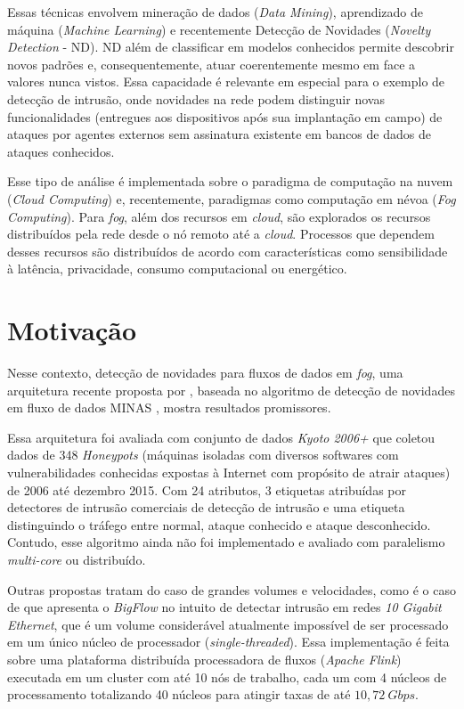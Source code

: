 Essas técnicas envolvem mineração de dados (\emph{Data Mining}), aprendizado de
máquina (\emph{Machine Learning}) e recentemente Detecção de Novidades
(\emph{Novelty Detection} - ND). ND além de classificar em modelos conhecidos
permite descobrir novos padrões e, consequentemente, atuar coerentemente mesmo
em face a valores nunca vistos. Essa capacidade é relevante em especial para o
exemplo de detecção de intrusão, onde novidades na rede podem distinguir novas
funcionalidades (entregues aos dispositivos após sua implantação em campo) de
ataques por agentes externos sem assinatura existente em bancos de
dados de ataques conhecidos.


Esse tipo de análise é implementada sobre o paradigma de computação na nuvem
(\emph{Cloud Computing}) e, recentemente, paradigmas como computação em névoa
(\emph{Fog Computing}). Para \emph{fog}, além dos recursos em \emph{cloud}, são
explorados os recursos distribuídos pela rede desde o nó remoto até a
\emph{cloud}. Processos que dependem desses recursos são distribuídos de acordo
com características como sensibilidade à latência, privacidade,
consumo computacional ou energético.

\section{Motivação}

Nesse contexto, detecção de novidades para fluxos de dados em \emph{fog}, uma
arquitetura recente proposta por , baseada no algoritmo
de detecção de novidades em fluxo de dados MINAS
\cite{Faria2016minas}, mostra resultados promissores.

Essa arquitetura foi avaliada com conjunto de dados \emph{Kyoto 2006+} que
coletou dados de 348 \emph{Honeypots} (máquinas isoladas com diversos softwares
com vulnerabilidades conhecidas expostas à Internet com propósito de atrair
ataques) de 2006 até dezembro 2015. Com 24 atributos, 3 etiquetas atribuídas por
detectores de intrusão comerciais de detecção de intrusão e uma etiqueta
distinguindo o tráfego entre normal, ataque conhecido e ataque desconhecido.
Contudo, esse algoritmo ainda não foi implementado e avaliado com paralelismo
\emph{multi-core} ou distribuído.

Outras propostas tratam do caso de grandes volumes e velocidades, como é o caso
de  que apresenta o \emph{BigFlow} no intuito de detectar
intrusão em redes \emph{10 Gigabit Ethernet}, que é um volume considerável
atualmente impossível de ser processado em um único núcleo de processador
(\emph{single-threaded}). Essa implementação é feita sobre uma plataforma
distribuída processadora de fluxos (\emph{Apache Flink}) executada em um cluster
com até 10 nós de trabalho, cada um com 4 núcleos de processamento totalizando
40 núcleos para atingir taxas de até $10,72 \ Gbps$.

